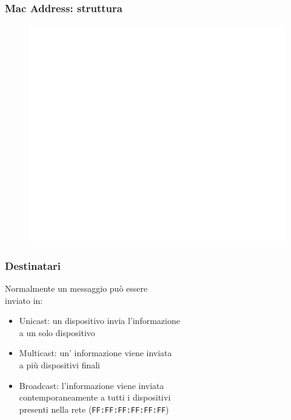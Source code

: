 \documentclass[aspectratio=169]{beamer}
\begin{document}
    \begin{frame}
        \frametitle{Mac Address: struttura}
        \begin{figure}
            \centering
            \includegraphics[width= 0.5\linewidth]{img/MAC-48_Address.png}
        \end{figure}
    \end{frame}
    
    \begin{frame}
        \frametitle{Destinatari}%
        
        
        Normalmente un messaggio può essere\\ inviato in:
        \begin{itemize}
            \item Unicast: un dispositivo invia l'informazione\\ a  un solo dispositivo
            \item Multicast: un' informazione viene inviata\\ a più dispositivi finali
            \item Broadcast: l'informazione viene inviata\\ contemporaneamente a tutti i dispositivi\\ presenti nella rete (\texttt{FF:FF:FF:FF:FF:FF})
        \end{itemize}
    \end{frame}
    
\end{document}
